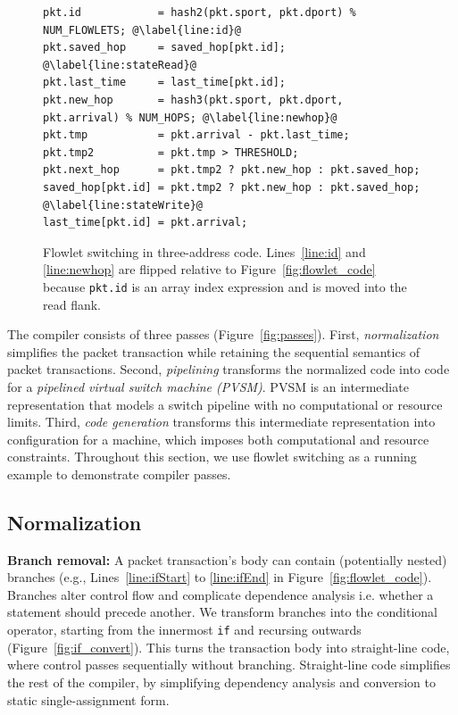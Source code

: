 \begin{figure}[!t]
\begin{minipage}{\textwidth}
\begin{lstlisting}[style=customc]
pkt.id            = hash2(pkt.sport, pkt.dport) % NUM_FLOWLETS; @\label{line:id}@
pkt.saved_hop     = saved_hop[pkt.id]; @\label{line:stateRead}@
pkt.last_time     = last_time[pkt.id];
pkt.new_hop       = hash3(pkt.sport, pkt.dport, pkt.arrival) % NUM_HOPS; @\label{line:newhop}@
pkt.tmp           = pkt.arrival - pkt.last_time;
pkt.tmp2          = pkt.tmp > THRESHOLD;
pkt.next_hop      = pkt.tmp2 ? pkt.new_hop : pkt.saved_hop;
saved_hop[pkt.id] = pkt.tmp2 ? pkt.new_hop : pkt.saved_hop; @\label{line:stateWrite}@
last_time[pkt.id] = pkt.arrival;
\end{lstlisting}
\caption[title2]{Flowlet switching in three-address
code. Lines~\ref{line:id} and \ref{line:newhop} are flipped relative
to Figure~\ref{fig:flowlet_code} because {\tt pkt.id} is an array index expression and is
moved into the read flank.}
\label{fig:three_address}
\end{minipage}
\vspace{-0.5cm}
\end{figure}

The \pktlanguage compiler consists of three passes
(Figure~\ref{fig:passes}).  First, \textit{normalization} simplifies
the packet transaction while retaining the sequential semantics of
packet transactions. Second, \textit{pipelining} transforms the
normalized code into code for a \textit{pipelined virtual switch
  machine (PVSM)}. PVSM is an intermediate representation that models
a switch pipeline with no computational or resource limits. Third,
\textit{code generation} transforms this intermediate representation
into configuration for a \absmachine machine, which imposes both
computational and resource constraints. Throughout this section, we
use flowlet switching as a running example to demonstrate compiler
passes.

\subsection{Normalization}
\label{ss:normalization}


\textbf{Branch removal: }A packet transaction's body can contain
(potentially nested) branches (e.g., Lines~\ref{line:ifStart} to
\ref{line:ifEnd} in Figure~\ref{fig:flowlet_code}).  Branches alter
control flow and complicate dependence analysis i.e.  whether a
statement should precede another.  We transform branches into the
conditional operator, starting from the innermost \texttt{if} and
recursing outwards (Figure~\ref{fig:if_convert}).  This turns the
transaction body into straight-line code, where control passes
sequentially without branching.  Straight-line code simplifies the
rest of the compiler, by simplifying dependency analysis and
conversion to static single-assignment form.

